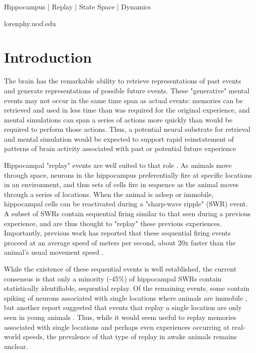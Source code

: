 \documentclass[times, twoside]{zHenriquesLab-StyleBioRxiv}
\begin{document}
\begin{keywords}
Hippocampus | Replay | State Space | Dynamics
\end{keywords}

\begin{corrauthor}
loren\at phy.ucsf.edu
\end{corrauthor}

\section*{Introduction}

The brain has the remarkable ability to retrieve representations of past events and generate representations of possible future events. These "generative" \cite{KayConstantSubsecondCycling2020} mental events may not occur in the same time span as actual events: memories can be retrieved and used in less time than was required for the original experience, and mental simulations can span a series of actions more quickly than would be required to perform those actions. Thus, a potential neural substrate for retrieval and mental simulation would be expected to support rapid reinstatement of patterns of brain activity associated with past or potential future experience 

Hippocampal "replay" events are well suited to that role \cite{CarrHippocampalreplayawake2011}. As animals move through space, neurons in the hippocampus preferentially fire at specific locations in an environment, and thus sets of cells fire in sequence as the animal moves through a series of locations. When the animal is asleep or immobile, hippocampal cells can be reactivated during a "sharp-wave ripple" (SWR) event. A subset of SWRs contain sequential firing similar to that seen during a previous experience, and are thus thought to "replay" these previous experiences. Importantly, previous work has reported that these sequential firing events proceed at an average speed of  meters per second, about 20x faster than the animal's usual movement speed \cite{NadasdyReplayTimeCompression1999, LeeMemorySequentialExperience2002, DavidsonHippocampalReplayExtended2009, KarlssonAwakereplayremote2009}. 

While the existence of these sequential events is well established, the current consensus is that only a minority (-45\%) of hippocampal SWRs contain statistically identifiable, sequential replay. Of the remaining events, some contain spiking of neurons associated with single locations where animals are immobile \cite{JaiDistincthippocampalcorticalmemory2017}, but another report suggested that events that replay a single location are only seen in young animals \cite{StellaHippocampalReactivationRandom2019}. Thus, while it would seem useful to replay memories associated with single locations and perhaps even experiences occurring at real-world speeds, the prevalence of that type of replay in awake animals remains unclear.
\end{document}
